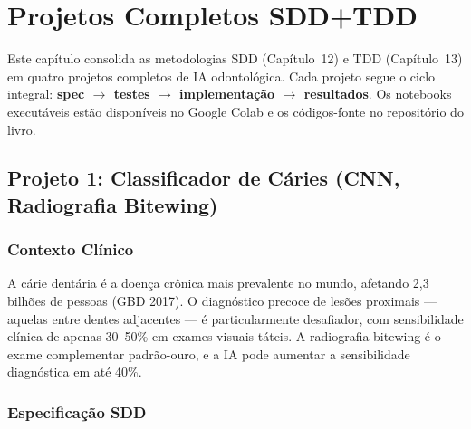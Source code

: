 \chapter{Projetos Completos SDD+TDD}
\label{cap:projetos-guiados}
\nivelquatro

Este capítulo consolida as metodologias SDD (Capítulo~12) e TDD
(Capítulo~13) em quatro projetos completos de IA odontológica. Cada
projeto segue o ciclo integral: \textbf{spec $\rightarrow$ testes
$\rightarrow$ implementação $\rightarrow$ resultados}. Os notebooks
executáveis estão disponíveis no Google Colab e os códigos-fonte no
repositório do livro.

\section{Projeto 1: Classificador de Cáries (CNN, Radiografia Bitewing)}

\subsection{Contexto Clínico}

A cárie dentária é a doença crônica mais prevalente no mundo, afetando
2,3 bilhões de pessoas (GBD 2017). O diagnóstico precoce de lesões
proximais — aquelas entre dentes adjacentes — é particularmente
desafiador, com sensibilidade clínica de apenas 30--50\% em exames
visuais-táteis. A radiografia bitewing é o exame complementar padrão-ouro,
e a IA pode aumentar a sensibilidade diagnóstica em até 40\%.

 


\subsection{Especificação SDD}

